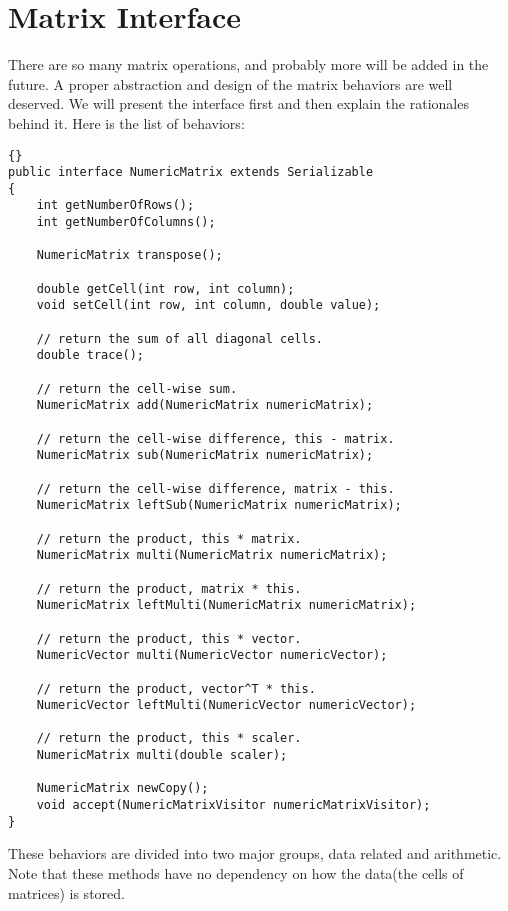 \section{Matrix Interface}
There are so many matrix operations, and probably more will be added in the future. A proper abstraction and design of the matrix behaviors are well deserved. We will present the interface first and then explain the rationales behind it. Here is the list of behaviors:
\lstset{language=Java}
\lstset{commentstyle=\textit}
\begin{lstlisting}[frame=trbl]{}
public interface NumericMatrix extends Serializable 
{   
    int getNumberOfRows();
    int getNumberOfColumns();

    NumericMatrix transpose();

    double getCell(int row, int column);    
    void setCell(int row, int column, double value);    

    // return the sum of all diagonal cells. 
    double trace();

    // return the cell-wise sum.
    NumericMatrix add(NumericMatrix numericMatrix);

    // return the cell-wise difference, this - matrix.
    NumericMatrix sub(NumericMatrix numericMatrix);

    // return the cell-wise difference, matrix - this.
    NumericMatrix leftSub(NumericMatrix numericMatrix);

    // return the product, this * matrix.
    NumericMatrix multi(NumericMatrix numericMatrix);

    // return the product, matrix * this.
    NumericMatrix leftMulti(NumericMatrix numericMatrix);  
  
    // return the product, this * vector.
    NumericVector multi(NumericVector numericVector);

    // return the product, vector^T * this.
    NumericVector leftMulti(NumericVector numericVector);

    // return the product, this * scaler. 
    NumericMatrix multi(double scaler);

    NumericMatrix newCopy();
    void accept(NumericMatrixVisitor numericMatrixVisitor);
}
\end{lstlisting}
These behaviors are divided into two major groups, data related and arithmetic. Note that these methods have no dependency on how the data(the cells of matrices) is stored.

